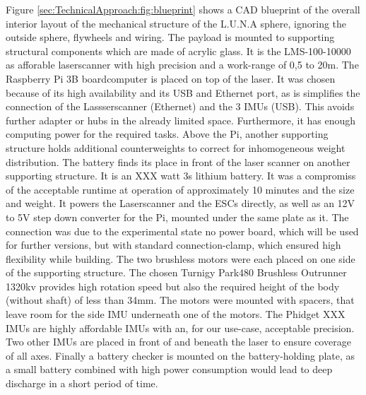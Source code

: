Figure \ref{sec:TechnicalApproach:fig:blueprint} shows a CAD blueprint of the overall interior layout of the mechanical structure of the L.U.N.A sphere, ignoring the outside sphere, flywheels and wiring.
The payload is mounted to supporting structural components which are made of acrylic glass. It is the LMS-100-10000 as afforable laserscanner with high precision and a work-range of 0,5 to 20m.
The Raspberry Pi 3B boardcomputer is placed on top of the laser. It was chosen because of its high availability and its USB and Ethernet port, as is simplifies the connection of the Lassserscanner (Ethernet) and the 3 IMUs (USB). This avoids further adapter or hubs in the already limited space. Furthermore, it has enough computing power for the required tasks.
Above the Pi, another supporting structure holds additional counterweights to correct for inhomogeneous weight distribution.                                                                                                     
The battery finds its place in front of the laser scanner on another supporting structure. It is an XXX watt 3s lithium battery. It was a compromiss of the acceptable runtime at operation of approximately 10 minutes and the size and weight. It powers the Laserscanner and the ESCs directly, as well as an 12V to 5V step down converter for the Pi, mounted under the same plate as it.  The connection was due to the experimental state no power board, which will be used for further versions, but with standard connection-clamp, which ensured high flexibility while building. 
The two brushless motors were each placed on one side of the supporting structure. The chosen Turnigy Park480 Brushless Outrunner 1320kv provides high rotation speed but also the required height of the body (without shaft) of less than 34mm.
The motors were mounted with spacers, that leave room for the side IMU underneath one of the motors. 
The Phidget XXX IMUs are highly affordable IMUs with an, for our use-case, acceptable precision.
Two other IMUs are placed in front of and beneath the laser to ensure coverage of all axes. 
Finally a battery checker is mounted on the battery-holding plate, as a small battery combined with high power consumption would lead to deep discharge in a short period of time.

